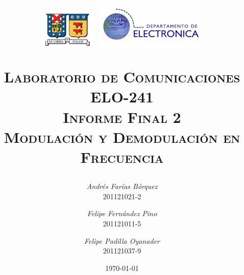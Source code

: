 
\begin{titlepage}
\title{\begin{minipage}{\textwidth}
\vspace{-9em}
\includegraphics[width=0.2\textwidth]{img/logo_utfsm}
\hfill
\includegraphics[width=0.4\textwidth]{img/logoelo2}
\vspace{1em}
\end{minipage}
\HRule \vspace{1em} \textsc{Laboratorio de Comunicaciones\\ELO-241\\ \Large \vspace{1em} \textbf{Informe Final 2}\\Modulación y Demodulación en Frecuencia} \HRule \vspace{3em}}
\author{\textsl{Andrés Farías Bórquez}\\201121021-2 \and \textsl{Felipe Fernández Pino}\\201121011-5 \and \textsl{Felipe Padilla Oyanader}\\201121037-9}
\date{\vfill \today}
\end{titlepage}

\pagestyle{fancy}
